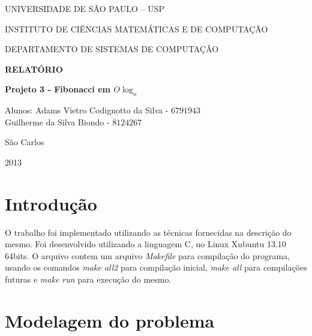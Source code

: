 \documentclass[10pt,a4paper]{article}
\begin{document}
\thispagestyle{empty}
\begin{center}
	UNIVERSIDADE DE SÃO PAULO – USP
	
	INSTITUTO DE CIÊNCIAS MATEMÁTICAS E DE COMPUTAÇÃO
	
	DEPARTAMENTO DE SISTEMAS DE COMPUTAÇÃO
	
	\vspace{7cm}
	
	\Large{\textbf{RELATÓRIO}}
	 
	\Large{\textbf{Projeto 3 - Fibonacci em $O\log_n$}}
	
	\vspace{6cm}
	
	Alunos: Adams Vietro Codignotto da Silva - $6791943$ \\ 
			Guilherme da Silva Biondo - $8124267$
	
	\vspace{6cm}
	
	São Carlos
	
	2013
\end{center}

\newpage


\section{Introdução}

O trabalho foi implementado utilizando as técnicas fornecidas na descrição do mesmo. Foi desenvolvido utilizando a linguagem C, no Linux Xubuntu 13.10 64bits. O arquivo contem um arquivo \emph{Makefile} para compilação do programa, usando os comandos \emph{make all2} para compilação inicial, \textit{make all} para compilações futuras e \emph{make run} para execução do mesmo.

\section{Modelagem do problema}	
\end{document}
